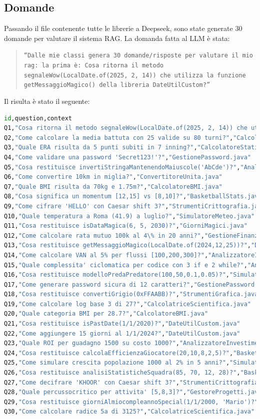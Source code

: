 \documentclass[12pt,a4paper,openright,twoside]{book}
\begin{document}
\subsection{Domande}
Passando il file contenente tutte le librerie a Deepseek, sono state generate 30 domande per valutare il sistema RAG.
La domanda fatta al LLM è stata:
\begin{quote}
    \texttt{``Dalle mie classi genera 30 domande/risposte per valutare il mio rag:
    la prima è: Cosa ritorna il metodo segnaleWow(LocalDate.of(2025, 2, 14))
    che utilizza la funzione getMessaggioMagico() della libreria
    DateUtilCustom?''}
\end{quote}
Il risulta è stato il seguente:
\begin{lstlisting}[language=Python, caption={Domande generate da Deepssek}]
    id,question,context
Q1,"Cosa ritorna il metodo segnaleWow(LocalDate.of(2025, 2, 14)) che utilizza la funzione getMessaggioMagico()?","GiorniMagici.java"
Q2,"Come calcolare la media battuta con 25 valide su 80 turni?","CalcolatoreStatisticheBaseball.java"
Q3,"Quale ERA risulta da 5 punti subiti in 7 inning?","CalcolatoreStatisticheBaseball.java"
Q4,"Come validare una password 'Secret123!'?","GestionePassword.java"
Q5,"Cosa restituisce invertiStringaMantenendoMaiuscole('AbCde')?","AnalizzatoreTesto.java"
Q6,"Come convertire 10km in miglia?","ConvertitoreUnita.java"
Q7,"Quale BMI risulta da 70kg e 1.75m?","CalcolatoreBMI.java"
Q8,"Cosa significa un momentum [12,15] vs [8,10]?","BasketballStats.java"
Q9,"Come cifrare 'HELLO' con Caesar shift 3?","StrumentiCrittografia.java"
Q10,"Quale temperatura a Roma (41.9) a luglio?","SimulatoreMeteo.java"
Q11,"Cosa restituisce isDataMagica(6, 5, 2030)?","GiorniMagici.java"
Q12,"Come calcolare rata mutuo 100k al 4\% in 20 anni?","GestioneFinanzePersonali.java"
Q13,"Cosa restituisce getMessaggioMagico(LocalDate.of(2024,12,25))?","DateUtilCustom.java"
Q14,"Come calcolare VAN al 5% per flussi [100,200,300]?","AnalizzatoreInvestimenti.java"
Q15,"Quale complessita' ciclomatica per codice con 3 if e 2 while?","AnalizzatoreCodice.java"
Q16,"Cosa restituisce modelloPredaPredatore(100,50,0.1,0.05)?","SimulatoreEcologico.java"
Q17,"Come generare password sicura di 12 caratteri?","GestionePassword.java"
Q18,"Cosa restituisce convertiGrigio(0xFFAABB)?","StrumentiGrafica.java"
Q19,"Come calcolare log base 3 di 27?","CalcolatriceScientifica.java"
Q20,"Quale categoria BMI per 28.7?","CalcolatoreBMI.java"
Q21,"Cosa restituisce isPastDate(1/1/2020)?","DateUtilCustom.java"
Q22,"Come aggiungere 15 giorni al 1/1/2024?","DateUtilCustom.java"
Q23,"Quale ROI per guadagno 1500 su costo 1000?","AnalizzatoreInvestimenti.java"
Q24,"Cosa restituisce calcolaEfficienzaGiocatore(20,10,8,2,5)?","BasketballStats.java"
Q25,"Come simulare crescita popolazione 1000 al 2% in 5 anni?","SimulatoreEcologico.java"
Q26,"Cosa restituisce analisiStatisticheSquadra(85, 70, 12, 28)?","BasketballStats.java"
Q27,"Come decifrare 'KHOOR' con Caesar shift 3?","StrumentiCrittografia.java"
Q28,"Quale percussocritico per attivita' [5,8,3]?","GestoreProgetti.java"
Q29,"Cosa restituisce giorniAlmiocompleannoSpecial(1/1/2000, 'Mario')?","DateUtilCustom.java"
Q30,"Come calcolare radice 5a di 3125?","CalcolatriceScientifica.java"
\end{lstlisting}
\end{document}
